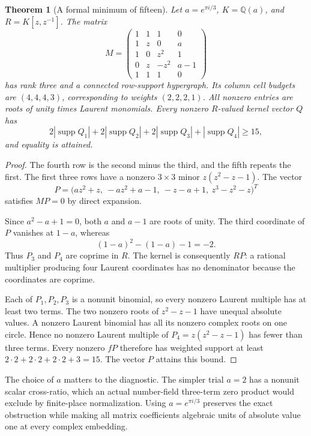 \documentclass[11pt,a4paper,oneside]{report}
\newtheorem{theorem}{Theorem}[section]
\theoremstyle{definition}
\theoremstyle{remark}
\DeclareMathOperator{\supp}{supp}
\newcommand{\Q}{\mathbb Q}
\begin{document}
\begin{theorem}[A formal minimum of fifteen]\label{M12:frontier:fifteen}
Let $a=e^{\pi i/3}$, $K=\Q(a)$, and $R=K[z,z^{-1}]$. The matrix
\begin{equation}\label{M12:frontier:model-matrix}
 M=\begin{pmatrix}
 1&1&1&0\\
 1&z&0&a\\
 1&0&z^2&1\\
 0&z&-z^2&a-1\\
 1&1&1&0
 \end{pmatrix}
\end{equation}
has rank three and a connected row-support hypergraph. Its column
cell budgets are $(4,4,4,3)$, corresponding to weights $(2,2,2,1)$.
All nonzero entries are roots of unity times Laurent monomials.
Every nonzero $R$-valued kernel vector $Q$ has
\[
 2|\supp Q_1|+2|\supp Q_2|+2|\supp Q_3|+|\supp Q_4|\ge15,
\]
and equality is attained.
\end{theorem}
\begin{proof}
The fourth row is the second minus the third, and the fifth repeats
the first. The first three rows have a nonzero $3\times3$ minor
$z(z^2-z-1)$. The vector
\begin{equation}\label{M12:frontier:model-kernel}
 P=\bigl(az^2+z,\ -az^2+a-1,\ -z-a+1,\ z^3-z^2-z\bigr)^T
\end{equation}
satisfies $MP=0$ by direct expansion.

Since $a^2-a+1=0$, both $a$ and $a-1$ are roots of unity.
The third coordinate of $P$ vanishes at $1-a$, whereas
\[
 (1-a)^2-(1-a)-1=-2.
\]
Thus $P_3$ and $P_4$ are coprime in $R$. The kernel is consequently
$RP$: a rational multiplier producing four Laurent coordinates
has no denominator because the coordinates are coprime.

Each of $P_1,P_2,P_3$ is a nonunit binomial, so every nonzero Laurent
multiple has at least two terms. The two nonzero roots of $z^2-z-1$
have unequal absolute values. A nonzero Laurent binomial has all its
nonzero complex roots on one circle. Hence no nonzero Laurent
multiple of $P_4=z(z^2-z-1)$ has fewer than three terms.
Every nonzero $fP$ therefore has weighted support at least
$2\cdot2+2\cdot2+2\cdot2+3=15$. The vector $P$ attains this bound.
\end{proof}

The choice of $a$ matters to the diagnostic. The simpler trial $a=2$
has a nonunit scalar cross-ratio, which an actual number-field
three-term zero product would exclude by finite-place normalization.
Using $a=e^{\pi i/3}$ preserves the exact obstruction while making
all matrix coefficients algebraic units of absolute value one at
every complex embedding.
\end{document}

